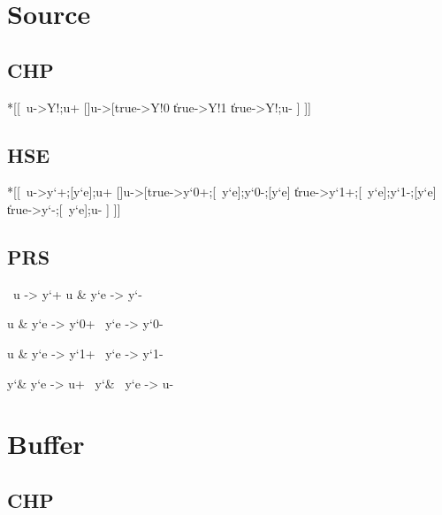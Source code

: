 \documentclass{article}
\begin{document}

\section{Source}

\subsection*{CHP}

\begin{csp}
*[[~u->Y!\phi;u+
  []u->[true->Y!0
         \|true->Y!1
         \|true->Y!\neg\phi;u-
         ]
 ]]
\end{csp}

\subsection*{HSE}

\begin{hse}
*[[~u->y`\phi+;[y`e];u+
  []u->[true->y`0+;[~y`e];y`0-;[y`e]
         \|true->y`1+;[~y`e];y`1-;[y`e]
         \|true->y`\phi-;[~y`e];u-
         ]
 ]]
\end{hse}

\subsection*{PRS}

\begin{prs2}
~u -> y`\phi+
u & y`e -> y`\phi-
\end{prs2}

\begin{prs2}
u & y`e -> y`0+
~y`e -> y`0-

u & y`e -> y`1+
~y`e -> y`1-
\end{prs2}

\begin{prs2}
y`\phi & y`e -> u+
~y`\phi & ~y`e -> u-
\end{prs2}

\section{Buffer}

\subsection*{CHP}
\end{document}
